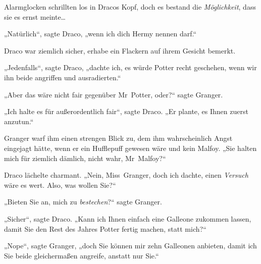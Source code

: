 Alarmglocken schrillten los in Dracos Kopf, doch es bestand die \emph{Möglichkeit}, dass sie es ernst meinte…

„Natürlich“, sagte Draco, „wenn ich dich Hermy nennen darf.“

Draco war ziemlich sicher, erhabe ein Flackern auf ihrem Gesicht bemerkt.

„Jedenfalls“, sagte Draco, „dachte ich, es würde Potter recht geschehen, wenn wir ihn beide angriffen und ausradierten.“

„Aber das wäre nicht fair gegenüber Mr~Potter, oder?“ sagte Granger.

„Ich halte es für außerordentlich fair“, sagte Draco. „Er plante, es Ihnen zuerst anzutun.“

Granger warf ihm einen strengen Blick zu, dem ihm wahrscheinlich Angst eingejagt hätte, wenn er ein Hufflepuff gewesen wäre und kein Malfoy. „Sie halten mich für ziemlich dämlich, nicht wahr, Mr~Malfoy?“

Draco lächelte charmant. „Nein, Miss~Granger, doch ich dachte, einen \emph{Versuch} wäre es wert. Also, was wollen Sie?“

„Bieten Sie an, mich zu \emph{bestechen}?“ sagte Granger.

„Sicher“, sagte Draco. „Kann ich Ihnen einfach eine Galleone zukommen lassen, damit Sie den Rest des Jahres Potter fertig machen, statt mich?“

„Nope“, sagte Granger, „doch Sie können mir zehn Galleonen anbieten, damit ich Sie beide gleichermaßen angreife, anstatt nur Sie.“

